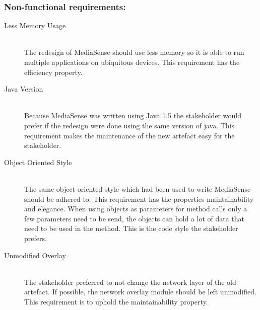 \subsubsection{Non-functional requirements:}
\begin{description}
	\item[Less Memory Usage] \hfill \\
	The redesign of MediaSense should use less memory so it is able to run multiple applications on ubiquitous devices. This requirement has the efficiency property.

	\item[Java Version] \hfill \\
	Because MediaSense was written using Java 1.5 the stakeholder would prefer if the redesign were done using the same version of java. This requirement makes the maintenance of the new artefact easy for the stakeholder. 
	
	\item[Object Oriented Style] \hfill \\
	The same object oriented style which had been used to write MediaSense should be adhered to. This requirement has the properties maintainability and elegance. When using objects as parameters for method calls only a few parameters need to be send, the objects can hold a lot of data that need to be used in the method. This is the code style the stakeholder prefers. 
	
	\item[Unmodified Overlay] \hfill \\
	The stakeholder preferred to not change the network layer of the old artefact. If possible, the network overlay module should be left unmodified. This requirement is to uphold the maintainability property.
\end{description}	


